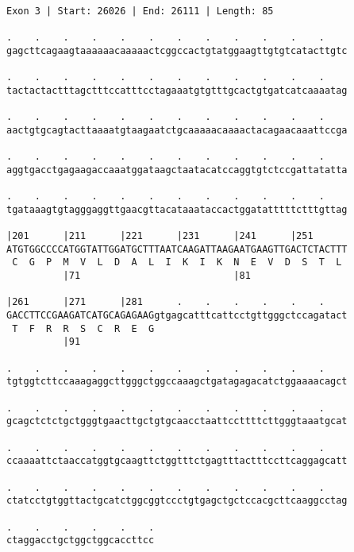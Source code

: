 \documentclass{article}
\begin{document}
\newpage
\begin{Verbatim}[fontfamily=courier]
Exon 3 | Start: 26026 | End: 26111 | Length: 85

.    .    .    .    .    .    .    .    .    .    .    .    
gagcttcagaagtaaaaaacaaaaactcggccactgtatggaagttgtgtcatacttgtc

.    .    .    .    .    .    .    .    .    .    .    .    
tactactactttagctttccatttcctagaaatgtgtttgcactgtgatcatcaaaatag

.    .    .    .    .    .    .    .    .    .    .    .    
aactgtgcagtacttaaaatgtaagaatctgcaaaaacaaaactacagaacaaattccga

.    .    .    .    .    .    .    .    .    .    .    .    
aggtgacctgagaagaccaaatggataagctaatacatccaggtgtctccgattatatta

.    .    .    .    .    .    .    .    .    .    .    .    
tgataaagtgtagggaggttgaacgttacataaataccactggatatttttctttgttag

|201      |211      |221      |231      |241      |251      
ATGTGGCCCCATGGTATTGGATGCTTTAATCAAGATTAAGAATGAAGTTGACTCTACTTT
 C  G  P  M  V  L  D  A  L  I  K  I  K  N  E  V  D  S  T  L 
          |71                           |81                 

|261      |271      |281      .    .    .    .    .    .    
GACCTTCCGAAGATCATGCAGAGAAGgtgagcatttcattcctgttgggctccagatact
 T  F  R  R  S  C  R  E  G                                  
          |91                                               

.    .    .    .    .    .    .    .    .    .    .    .    
tgtggtcttccaaagaggcttgggctggccaaagctgatagagacatctggaaaacagct

.    .    .    .    .    .    .    .    .    .    .    .    
gcagctctctgctgggtgaacttgctgtgcaacctaattccttttcttgggtaaatgcat

.    .    .    .    .    .    .    .    .    .    .    .    
ccaaaattctaaccatggtgcaagttctggtttctgagtttactttccttcaggagcatt

.    .    .    .    .    .    .    .    .    .    .    .    
ctatcctgtggttactgcatctggcggtccctgtgagctgctccacgcttcaaggcctag

.    .    .    .    .    .
ctaggacctgctggctggcaccttcc
\end{Verbatim}
\newpage
\end{document}
